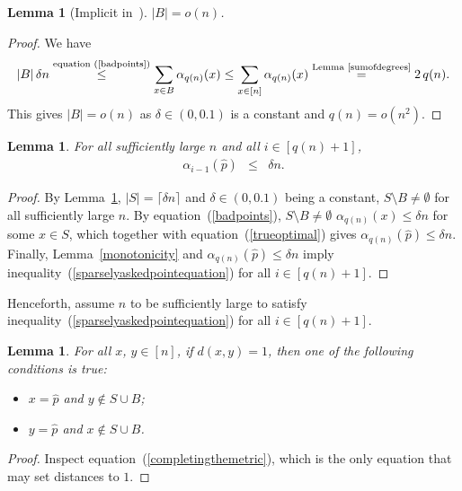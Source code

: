 \documentclass[letterpaper,12pt]{article}
\newtheorem{lemma}[theorem]{Lemma}
\newcommand{\comment}[1]{}
\begin{document}
\begin{lemma}[{Implicit in~\cite[Lemma~13]{Cha12}}]\label{fewbadpoints}
$|B|=o(n)$.
\end{lemma}
\begin{proof}
We have
$$
|B|\,\delta n
\stackrel{\text{equation~(\ref{badpoints})}}{\le} \sum_{x\in B} \alpha_{q(n)}(x)
\le \sum_{x\in [n]} \alpha_{q(n)}(x)
\stackrel{\text{Lemma~\ref{sumofdegrees}}}{=}
2\,q(n).
$$
This gives $|B|=o(n)$ as $\delta\in(0,0.1)$ is a constant and $q(n)=o(n^2)$.
\end{proof}

\begin{lemma}\label{sparselyaskedpoint}
For all sufficiently large $n$ and all $i\in[q(n)+1]$,
\begin{eqnarray}
\alpha_{i-1}\left(\hat{p}\right)&\le& \delta n.
\label{sparselyaskedpointequation}
\end{eqnarray}
\end{lemma}
\begin{proof}
By Lemma~\ref{fewbadpoints}, $|S|=\lceil\delta n\rceil$ and $\delta\in(0,0.1)$
being a constant,
$S\setminus B\neq\emptyset$ for all sufficiently large $n$.
By equation~(\ref{badpoints}), $S\setminus B\neq\emptyset$
$\alpha_{q(n)}(x)\le \delta n$ for some $x\in S$,
which together with equation~(\ref{trueoptimal})
gives $\alpha_{q(n)}(\hat{p})\le\delta n$.
Finally, Lemma~\ref{monotonicity} and $\alpha_{q(n)}(\hat{p})\le\delta n$
imply inequality~(\ref{sparselyaskedpointequation}) for all $i\in[q(n)+1]$.
\comment{Furthermore,
$$
|S|\cdot\alpha_{q(n)}\left(\hat{p}\right)
\stackrel{\text{equation~(\ref{trueoptimal})}}{\le}
\sum_{x\in S}\, \alpha_{q(n)}(x)
\le
\sum_{x\in[n]}\, \alpha_{q(n)}(x)
\stackrel{\text{Lemma~\ref{sumofdegrees}}}{=}
2\cdot q(n).
$$
So
$\alpha_{q(n)}(\hat{p})\le 2\cdot q(n)/|S|=o(n)$,
which together with
Lemma~\ref{monotonicity}
shows
$\alpha_{i-1}(\hat{p})
\le\alpha_{q(n)}(\hat{p})
\le\delta n$
for all sufficiently large $n$
and all $i\in[q(n)+1]$.
}\end{proof}

Henceforth, assume $n$ to be sufficiently large to satisfy
inequality~(\ref{sparselyaskedpointequation}) for all $i\in[q(n)+1]$.

\begin{lemma}\label{onlysourceofdistance1}
For all $x$, $y\in[n]$, if $d(x,y)=1$, then
one of the following conditions is true:
\begin{itemize}
\item $x=\hat{p}$ and $y\notin S\cup B$;
\item $y=\hat{p}$ and $x\notin S\cup B$.
\end{itemize}
\end{lemma}
\begin{proof}
Inspect equation~(\ref{completingthemetric}), which
is the only equation that may set distances to $1$.
\end{proof}
\end{document}
